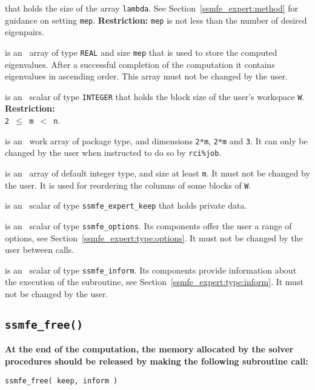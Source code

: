 \begin{description}
that holds the size of the array {\tt lambda}.
See Section~\ref{ssmfe_expert:method} for guidance on
setting {\tt mep}.
{\bf Restriction:} 
{\tt mep} is not less than the number of desired eigenpairs.
%
\item[\texttt{lambda(:)}] is an \intentinout\
array of type \texttt{REAL}
and size {\tt mep} that is
used to store the computed eigenvalues.
After a successful completion of the computation
it contains eigenvalues in ascending order.
This array must not be changed by the user.
%
\item[\texttt{m}] is an \intentin\ scalar of type {\tt INTEGER} that
holds the block size of the user's workspace {\tt W}. 
{\bf Restriction:} \\{\tt 2 $\le$ m $<$ n}.
%
\item[\texttt{rr(:,:,:)}] is an \intentinout\
work array of package type,
and dimensions {\tt 2*m}, {\tt 2*m} and {\tt 3}.
It can only be changed by the user when
instructed to do so by 
{\tt rci\%job}.
%
\item[\texttt{ind(:)}] is an \intentinout\ 
array of default integer type, and size at least {\tt m}. 
It must not be changed by the user.
It is used for reordering the columns of some blocks of {\tt W}.
%
\item[\texttt{keep}] is an \intentinout\ scalar of type 
{\tt ssmfe\_expert\_keep} 
that holds private data. 
%
\item[\texttt{options}] is an \intentin\  scalar  of type {\tt ssmfe\_options}.
Its components offer the user a range of options,
see Section~\ref{ssmfe_expert:type:options}.
It must not be changed by the user between calls.
%
\item[\texttt{inform}] is an \intentinout\ scalar of type 
{\tt ssmfe\_inform}. Its components provide information about the execution
of the subroutine, see Section~\ref{ssmfe_expert:type:inform}.
It must not be changed by the user.
%
\end{description}

\subsection{\texttt{ssmfe\_free()}}

{\bf
At the end of the computation, the memory 
allocated by the solver procedures
should be released
by making the following subroutine call:
}

\medskip

\hspace{8mm} {\tt ssmfe\_free( keep, inform )}

